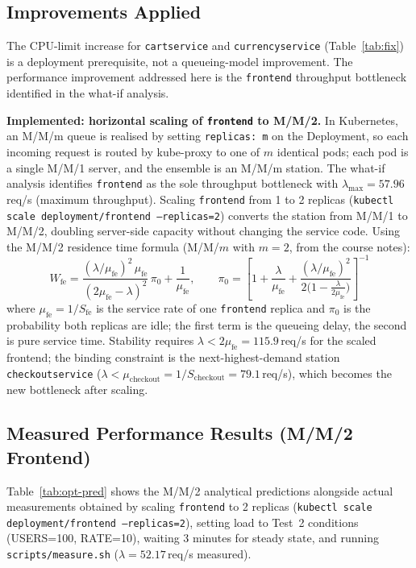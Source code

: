 \documentclass[12pt]{article}
\begin{document}
\subsection{Improvements Applied}

The CPU-limit increase for \texttt{cartservice} and \texttt{currencyservice} (Table~\ref{tab:fix}) is a deployment prerequisite, not a queueing-model improvement. The performance improvement addressed here is the \texttt{frontend} throughput bottleneck identified in the what-if analysis.

\textbf{Implemented: horizontal scaling of \texttt{frontend} to M/M/2.} In Kubernetes, an M/M/m queue is realised by setting \texttt{replicas: m} on the Deployment, so each incoming request is routed by kube-proxy to one of $m$ identical pods; each pod is a single M/M/1 server, and the ensemble is an M/M/m station. The what-if analysis identifies \texttt{frontend} as the sole throughput bottleneck with $\lambda_{\max}=57.96$\,req/s (maximum throughput). Scaling \texttt{frontend} from 1 to 2 replicas (\texttt{kubectl scale deployment/frontend --replicas=2}) converts the station from M/M/1 to M/M/2, doubling server-side capacity without changing the service code. Using the M/M/2 residence time formula (M/M/$m$ with $m=2$, from the course notes):
\[
  W_{\text{fe}} = \frac{(\lambda/\mu_{\text{fe}})^{2}\,\mu_{\text{fe}}}{(2\mu_{\text{fe}}-\lambda)^{2}}\,\pi_0 + \frac{1}{\mu_{\text{fe}}}, \qquad
  \pi_0 = \left[1 + \frac{\lambda}{\mu_{\text{fe}}} + \frac{(\lambda/\mu_{\text{fe}})^{2}}{2\bigl(1-\tfrac{\lambda}{2\mu_{\text{fe}}}\bigr)}\right]^{-1}
\]
where $\mu_{\text{fe}} = 1/S_{\text{fe}}$ is the service rate of one \texttt{frontend} replica and $\pi_0$ is the probability both replicas are idle; the first term is the queueing delay, the second is pure service time. Stability requires $\lambda < 2\mu_{\text{fe}} = 115.9$\,req/s for the scaled frontend; the binding constraint is the next-highest-demand station \texttt{checkoutservice} ($\lambda < \mu_{\text{checkout}} = 1/S_{\text{checkout}} = 79.1$\,req/s), which becomes the new bottleneck after scaling.

\subsection{Measured Performance Results (M/M/2 Frontend)}

Table~\ref{tab:opt-pred} shows the M/M/2 analytical predictions alongside actual measurements obtained by scaling \texttt{frontend} to 2 replicas (\texttt{kubectl scale deployment/frontend --replicas=2}), setting load to Test~2 conditions (USERS=100, RATE=10), waiting 3 minutes for steady state, and running \texttt{scripts/measure.sh} ($\lambda=52.17$\,req/s measured).
\end{document}
